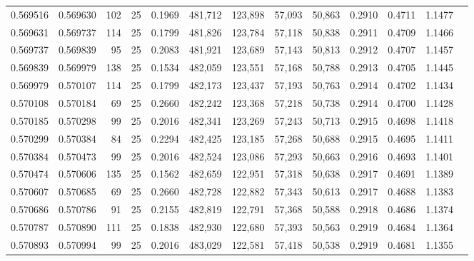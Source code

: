 \begin{tabular}{rrrrrrrrrrrrr}
0.569516 & 0.569630 &   102 &  25 &                                     0.1969 & 481,712 & 123,898 &  57,093 &  50,863 & 0.2910 & 0.4711 & 1.1477 \\
0.569631 & 0.569737 &   114 &  25 &                                     0.1799 & 481,826 & 123,784 &  57,118 &  50,838 & 0.2911 & 0.4709 & 1.1466 \\
0.569737 & 0.569839 &    95 &  25 &                                     0.2083 & 481,921 & 123,689 &  57,143 &  50,813 & 0.2912 & 0.4707 & 1.1457 \\
0.569839 & 0.569979 &   138 &  25 &                                     0.1534 & 482,059 & 123,551 &  57,168 &  50,788 & 0.2913 & 0.4705 & 1.1445 \\
0.569979 & 0.570107 &   114 &  25 &                                     0.1799 & 482,173 & 123,437 &  57,193 &  50,763 & 0.2914 & 0.4702 & 1.1434 \\
0.570108 & 0.570184 &    69 &  25 &                                     0.2660 & 482,242 & 123,368 &  57,218 &  50,738 & 0.2914 & 0.4700 & 1.1428 \\
0.570185 & 0.570298 &    99 &  25 &                                     0.2016 & 482,341 & 123,269 &  57,243 &  50,713 & 0.2915 & 0.4698 & 1.1418 \\
0.570299 & 0.570384 &    84 &  25 &                                     0.2294 & 482,425 & 123,185 &  57,268 &  50,688 & 0.2915 & 0.4695 & 1.1411 \\
0.570384 & 0.570473 &    99 &  25 &                                     0.2016 & 482,524 & 123,086 &  57,293 &  50,663 & 0.2916 & 0.4693 & 1.1401 \\
0.570474 & 0.570606 &   135 &  25 &                                     0.1562 & 482,659 & 122,951 &  57,318 &  50,638 & 0.2917 & 0.4691 & 1.1389 \\
0.570607 & 0.570685 &    69 &  25 &                                     0.2660 & 482,728 & 122,882 &  57,343 &  50,613 & 0.2917 & 0.4688 & 1.1383 \\
0.570686 & 0.570786 &    91 &  25 &                                     0.2155 & 482,819 & 122,791 &  57,368 &  50,588 & 0.2918 & 0.4686 & 1.1374 \\
0.570787 & 0.570890 &   111 &  25 &                                     0.1838 & 482,930 & 122,680 &  57,393 &  50,563 & 0.2919 & 0.4684 & 1.1364 \\
0.570893 & 0.570994 &    99 &  25 &                                     0.2016 & 483,029 & 122,581 &  57,418 &  50,538 & 0.2919 & 0.4681 & 1.1355 \\

\end{tabular}
